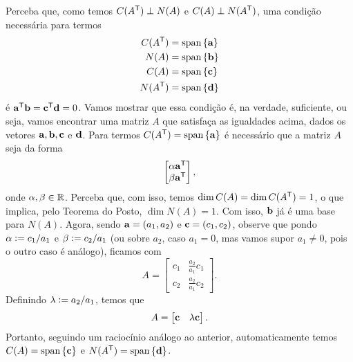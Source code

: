 \documentclass[leqno]{article}
\begin{document}
\begin{enumerate}
\begin{enumerate}
\begin{sol}
    Perceba que, como temos \( C ( A^{ \mathsf{T} } ) \perp N ( A ) \) e \( C ( A ) \perp N ( A^{ \mathsf{T} } ) \), uma condição necessária para termos
    \begin{align*}
        C ( A^{ \mathsf{T} } ) &= \operatorname{span} \left\{ \mathbf{a} \right\} \\
        N ( A ) &= \operatorname{span} \left\{ \mathbf{b} \right\} \\
        C ( A ) &= \operatorname{span}  \left\{ \mathbf{c} \right\} \\
        N ( A^{ \mathsf{T} } ) &= \operatorname{span}  \left\{ \mathbf{d} \right\}
    \end{align*}
    é \( \mathbf{a}^{ \mathsf{T} } \mathbf{b} = \mathbf{c}^{ \mathsf{T} } \mathbf{d} = 0 \).
    Vamos mostrar que essa condição é, na verdade, suficiente, ou seja, vamos encontrar uma matriz \( A \) que satisfaça as igualdades acima, dados os vetores \( \mathbf{a}, \mathbf{b}, \mathbf{c} \) e \( \mathbf{d} \).
    Para termos \( C ( A^{ \mathsf{T} } ) = \operatorname{span}  \left\{ \mathbf{a} \right\} \) é necessário que a matriz \( A \) seja da forma
    \begin{equation*}
        \begin{bmatrix}
            \alpha \mathbf{a}^{ \mathsf{T} } \\
            \beta \mathbf{a}^{ \mathsf{T} }
        \end{bmatrix}
    ,\end{equation*}
    onde \( \alpha, \beta \in \mathbb{R} \).
    Perceba que, com isso, temos \( \dim C ( A ) = \dim C ( A^{ \mathsf{T} } ) = 1 \), o que implica, pelo Teorema do Posto, \( \dim N ( A ) = 1 \).
    Com isso, \( \mathbf{b} \) já é uma base para \( N ( A ) \).
    Agora, sendo \( \mathbf{a} = ( a_{ 1 }, a_{ 2 } ) \) e \( \mathbf{c} = ( c_{ 1 }, c_{ 2 } ) \), observe que pondo \( \alpha \vcentcolon= c_{ 1 }/a_{ 1 } \) e \( \beta \vcentcolon= c_{ 2 } / a_{ 1 } \) (ou sobre \( a_{ 2 } \), caso \( a_{ 1 } = 0 \), mas vamos supor \( a_{ 1 } \neq 0 \), pois o outro caso é análogo), ficamos com
    \begin{equation*}
        A =
        \begin{bmatrix}
            c_{ 1 } & \frac{ a_{ 2 } }{ a_{ 1 } } c_{ 1 } \\
            c_{ 2 } & \frac{ a_{ 2 } }{ a_{ 1 } } c_{ 2 }
        \end{bmatrix}
    .\end{equation*}
    Definindo \( \lambda \vcentcolon= a_{ 2 } / a_{ 1 } \), temos que
    \begin{equation*}
        A = \begin{bmatrix}
            \mathbf{c} & \lambda \mathbf{c}
        \end{bmatrix}
    .\end{equation*}
    Portanto, seguindo um raciocínio análogo ao anterior, automaticamente temos \( C ( A ) = \operatorname{span} \left\{ \mathbf{c} \right\} \) e \( N ( A^{ \mathsf{T} } ) = \operatorname{span} \left\{ \mathbf{d} \right\} \).


\end{sol}
\end{enumerate}
\end{enumerate}
\end{document}
